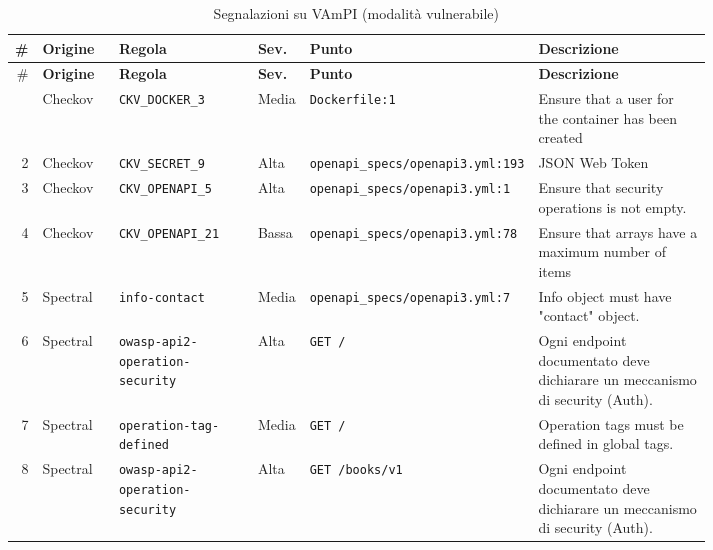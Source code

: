 \begingroup\linespread{1.0}\footnotesize\selectfont\setlength{\tabcolsep}{4pt}
\begin{longtable}{@{}r >{\raggedright\arraybackslash}p{0.11\linewidth} >{\raggedright\arraybackslash}p{0.2\linewidth} l >{\raggedright\arraybackslash}p{0.25\linewidth} >{\raggedright\arraybackslash}p{0.25\linewidth}@{}}
\caption{Segnalazioni su VAmPI (modalità vulnerabile)}\label{tab:app-vampi}\\
\toprule
\# & \textbf{Origine} & \textbf{Regola} & \textbf{Sev.} & \textbf{Punto} & \textbf{Descrizione}\\
\midrule\endfirsthead
\toprule
\# & \textbf{Origine} & \textbf{Regola} & \textbf{Sev.} & \textbf{Punto} & \textbf{Descrizione}\\
\midrule\endhead
\bottomrule\endfoot
1 & Checkov & \texttt{CKV\_\allowbreak{}DOCKER\_\allowbreak{}3} & Media & \texttt{Dockerfile:1} & Ensure that a user for the container has been created\\
2 & Checkov & \texttt{CKV\_\allowbreak{}SECRET\_\allowbreak{}9} & Alta & \texttt{openapi\_\allowbreak{}specs/\allowbreak{}openapi3.\allowbreak{}yml:193} & JSON Web Token\\
3 & Checkov & \texttt{CKV\_\allowbreak{}OPENAPI\_\allowbreak{}5} & Alta & \texttt{openapi\_\allowbreak{}specs/\allowbreak{}openapi3.\allowbreak{}yml:1} & Ensure that security operations is not empty.\\
4 & Checkov & \texttt{CKV\_\allowbreak{}OPENAPI\_\allowbreak{}21} & Bassa & \texttt{openapi\_\allowbreak{}specs/\allowbreak{}openapi3.\allowbreak{}yml:78} & Ensure that arrays have a maximum number of items\\
5 & Spectral & \texttt{info-\allowbreak{}contact} & Media & \texttt{openapi\_\allowbreak{}specs/\allowbreak{}openapi3.\allowbreak{}yml:7} & Info object must have "contact" object.\\
6 & Spectral & \texttt{owasp-\allowbreak{}api2-\allowbreak{}operation-\allowbreak{}security} & Alta & \texttt{GET /\allowbreak{}} & Ogni endpoint documentato deve dichiarare un meccanismo di security (Auth).\\
7 & Spectral & \texttt{operation-\allowbreak{}tag-\allowbreak{}defined} & Media & \texttt{GET /\allowbreak{}} & Operation tags must be defined in global tags.\\
8 & Spectral & \texttt{owasp-\allowbreak{}api2-\allowbreak{}operation-\allowbreak{}security} & Alta & \texttt{GET /\allowbreak{}books/\allowbreak{}v1} & Ogni endpoint documentato deve dichiarare un meccanismo di security (Auth).\\

\end{longtable}
